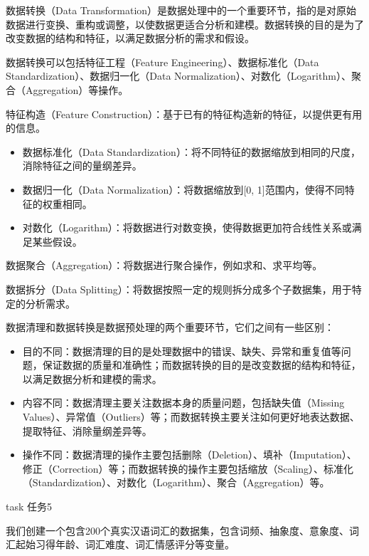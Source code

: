 \documentclass[]{book}
\begin{document}
数据转换（Data Transformation）是数据处理中的一个重要环节，指的是对原始数据进行变换、重构或调整，以使数据更适合分析和建模。数据转换的目的是为了改变数据的结构和特征，以满足数据分析的需求和假设。

数据转换可以包括特征工程（Feature Engineering）、数据标准化（Data Standardization）、数据归一化（Data Normalization）、对数化（Logarithm）、聚合（Aggregation）等操作。

特征构造（Feature Construction）：基于已有的特征构造新的特征，以提供更有用的信息。

\begin{itemize}
\item
  数据标准化（Data Standardization）：将不同特征的数据缩放到相同的尺度，消除特征之间的量纲差异。
\item
  数据归一化（Data Normalization）：将数据缩放到{[}0, 1{]}范围内，使得不同特征的权重相同。
\item
  对数化（Logarithm）：将数据进行对数变换，使得数据更加符合线性关系或满足某些假设。
\end{itemize}

数据聚合（Aggregation）：将数据进行聚合操作，例如求和、求平均等。

数据拆分（Data Splitting）：将数据按照一定的规则拆分成多个子数据集，用于特定的分析需求。

数据清理和数据转换是数据预处理的两个重要环节，它们之间有一些区别：

\begin{itemize}
\item
  目的不同：数据清理的目的是处理数据中的错误、缺失、异常和重复值等问题，保证数据的质量和准确性；而数据转换的目的是改变数据的结构和特征，以满足数据分析和建模的需求。
\item
  内容不同：数据清理主要关注数据本身的质量问题，包括缺失值（Missing Values）、异常值（Outliers）等；而数据转换主要关注如何更好地表达数据、提取特征、消除量纲差异等。
\item
  操作不同：数据清理的操作主要包括删除（Deletion）、填补（Imputation）、修正（Correction）等；而数据转换的操作主要包括缩放（Scaling）、标准化（Standardization）、对数化（Logarithm）、聚合（Aggregation）等。
\end{itemize}

\begin{infobox}task
任务5

我们创建一个包含200个真实汉语词汇的数据集，包含词频、抽象度、意象度、词汇起始习得年龄、词汇难度、词汇情感评分等变量。

\end{infobox}
\end{document}
